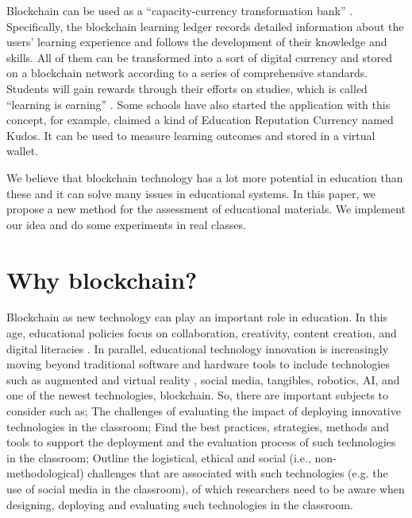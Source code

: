 \documentclass[manuscript,review,anonymous]{acmart}%
\begin{document}
Blockchain can be used as a ``capacity-currency transformation bank'' \cite{chen}. Specifically, the blockchain learning ledger records detailed information about the users' learning experience and follows the development of their knowledge and skills. All of them can be transformed into a sort of digital currency and stored on a blockchain network according to a series of comprehensive standards. Students will gain rewards through their efforts on studies, which is called ``learning is earning'' \cite{sharp1}. Some schools have also started the application with this concept, for example, \cite{sharp1} claimed a kind of Education Reputation Currency named Kudos. It can be used to measure learning outcomes and stored in a virtual wallet.

We believe that blockchain technology has a lot more potential in education than these and it can solve many issues in educational systems.
In this paper, we propose a new method for the assessment of educational materials. We implement our idea and do some experiments in real classes.



\section{Why blockchain?}
Blockchain as new technology can play an important role in education.
In this age, educational policies focus on collaboration, creativity, content creation, and digital literacies \cite{khar}.
In parallel, educational technology innovation is increasingly moving beyond traditional software and hardware tools to include technologies such as augmented and virtual reality \cite{9459415},
social media, tangibles, robotics, AI, and one of the newest technologies, blockchain.
So, there are important subjects to consider such as\cite{khar}; The challenges of evaluating
the impact of deploying innovative technologies in
the classroom; Find the best practices, strategies,
methods and tools to support the deployment and
the evaluation process of such technologies in the
classroom; Outline the logistical, ethical and
social (i.e., non-methodological) challenges that
are associated with such technologies (e.g. the
use of social media in the classroom), of which
researchers need to be aware when designing,
deploying and evaluating such technologies in the
classroom.
\end{document}
